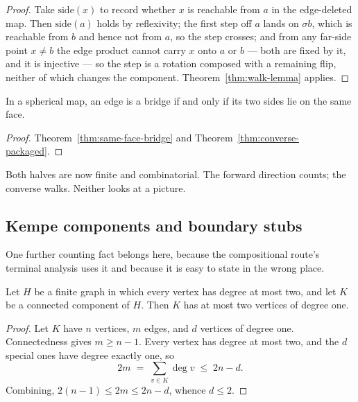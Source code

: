 \begin{proof}
Take $\mathrm{side}(x)$ to record whether $x$ is reachable from $a$ in the
edge-deleted map. Then $\mathrm{side}(a)$ holds by reflexivity; the first
step off $a$ lands on $\sigma b$, which is reachable from $b$ and hence not
from $a$, so the step crosses; and from any far-side point $x \neq b$ the
edge product cannot carry $x$ onto $a$ or $b$ --- both are fixed by it, and
it is injective --- so the step is a rotation composed with a remaining
flip, neither of which changes the component. Theorem~\ref{thm:walk-lemma}
applies.
\end{proof}

\begin{corollary}\label{cor:bridge-iff}
\Sprose
In a spherical map, an edge is a bridge if and only if its two sides lie on
the same face.
\end{corollary}

\begin{proof}
Theorem~\ref{thm:same-face-bridge} and Theorem~\ref{thm:converse-packaged}.
\end{proof}

Both halves are now finite and combinatorial. The forward direction counts;
the converse walks. Neither looks at a picture.

\subsection{Kempe components and boundary stubs}

One further counting fact belongs here, because the compositional route's
terminal analysis uses it and because it is easy to state in the wrong place.

\begin{lemma}\label{lem:two-stubs}
Let $H$ be a finite graph in which every vertex has degree at most two, and
let $K$ be a connected component of $H$. Then $K$ has at most two vertices of
degree one.
\end{lemma}

\begin{proof}
Let $K$ have $n$ vertices, $m$ edges, and $d$ vertices of degree one.
Connectedness gives $m \ge n - 1$. Every vertex has degree at most two, and
the $d$ special ones have degree exactly one, so
\[
  2m \;=\; \sum_{v \in K} \deg v \;\le\; 2n - d .
\]
Combining, $2(n-1) \le 2m \le 2n - d$, whence $d \le 2$.
\end{proof}

